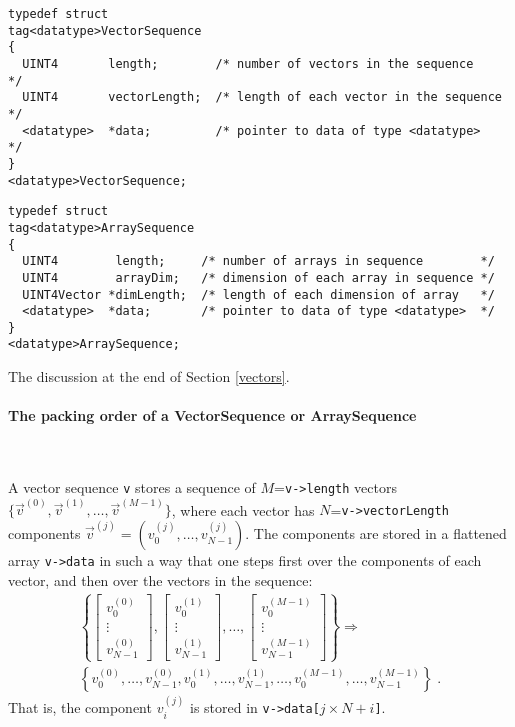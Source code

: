 \documentclass[]{ligodcc}
\begin{document}
{\footnotesize
\begin{verbatim}
typedef struct
tag<datatype>VectorSequence
{
  UINT4       length;        /* number of vectors in the sequence     */
  UINT4       vectorLength;  /* length of each vector in the sequence */
  <datatype>  *data;         /* pointer to data of type <datatype>    */
}
<datatype>VectorSequence;
\end{verbatim}}


{\footnotesize
\begin{verbatim}
typedef struct
tag<datatype>ArraySequence
{
  UINT4        length;     /* number of arrays in sequence        */
  UINT4        arrayDim;   /* dimension of each array in sequence */
  UINT4Vector *dimLength;  /* length of each dimension of array   */
  <datatype>  *data;       /* pointer to data of type <datatype>  */
}
<datatype>ArraySequence;
\end{verbatim}}

\noindent
The discussion at the end of Section \ref{vectors}.

\paragraph{The packing order of a VectorSequence or ArraySequence}~
\label{packingorderAS} 

\noindent A vector sequence {\tt v} stores a sequence of
$M$={\tt v->length} vectors
$\{\vec{v}^{(0)},\vec{v}^{(1)},\ldots,\vec{v}^{(M-1)}\}$, where each
vector has $N$={\tt v->vectorLength} components
$\vec{v}^{(j)}=(v^{(j)}_0,\ldots,v^{(j)}_{N-1})$.  The components are
stored in a flattened array {\tt v->data} in such a way that one
steps first over the components of each vector, and then over the
vectors in the sequence:
\begin{eqnarray}
\left\{
\left[\begin{array}{c} v^{(0)}_0 \\ \vdots \\ v^{(0)}_{N-1} \end{array}\right],
\left[\begin{array}{c} v^{(1)}_0 \\ \vdots \\ v^{(1)}_{N-1} \end{array}\right],
\ldots ,
\left[\begin{array}{c}
v^{(M-1)}_0 \\ \vdots \\ v^{(M-1)}_{N-1} \end{array}\right]
\right\} \Longrightarrow \nonumber\\
\left\{ v^{(0)}_0, \ldots, v^{(0)}_{N-1}, v^{(1)}_0, \ldots, v^{(1)}_{N-1},
\ldots, v^{(M-1)}_0, \ldots, v^{(M-1)}_{N-1} \right\} \; .
\end{eqnarray}
That is, the component $v^{(j)}_i$ is stored in
{\tt v->data[}$j\times N+i${\tt ]}.
   
\end{document}
